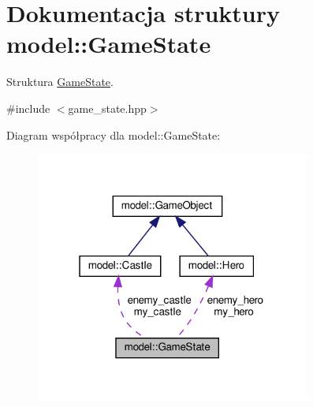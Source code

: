 \hypertarget{structmodel_1_1GameState}{}\section{Dokumentacja struktury model\+:\+:Game\+State}
\label{structmodel_1_1GameState}


Struktura \hyperlink{structmodel_1_1GameState}{Game\+State}.  




{\ttfamily \#include $<$game\+\_\+state.\+hpp$>$}



Diagram współpracy dla model\+:\+:Game\+State\+:\nopagebreak
\begin{figure}[H]
\begin{center}
\leavevmode
\includegraphics[width=256pt]{structmodel_1_1GameState__coll__graph}
\end{center}
\end{figure}
